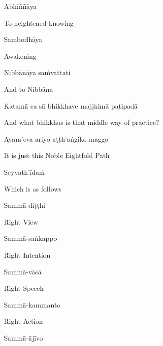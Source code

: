 Abhiññāya

\begin{english}
  To heightened knowing
\end{english}

Sambodhāya

\begin{english}
  Awakening
\end{english}

Nibbānāya saṁvattati

\begin{english}
  And to Nibbāna
\end{english}

Katamā ca sā bhikkhave majjhimā paṭipadā

\begin{english}
  And what bhikkhus is that middle way of practice?
\end{english}

Ayam'eva ariyo aṭṭh'aṅgiko maggo

\begin{english}
  It is just this Noble Eightfold Path\makeatletter\hyperlink{endnote51-appendix}\makeatother
\end{english}

Seyyath'īdaṁ

\begin{english}
  Which is as follows
\end{english}

Sammā-diṭṭhi

\begin{english}
  Right View
\end{english}

Sammā-saṅkappo

\begin{english}
  Right Intention
\end{english}

Sammā-vācā

\begin{english}
  Right Speech
\end{english}

Sammā-kammanto

\begin{english}
  Right Action
\end{english}

Sammā-ājīvo


